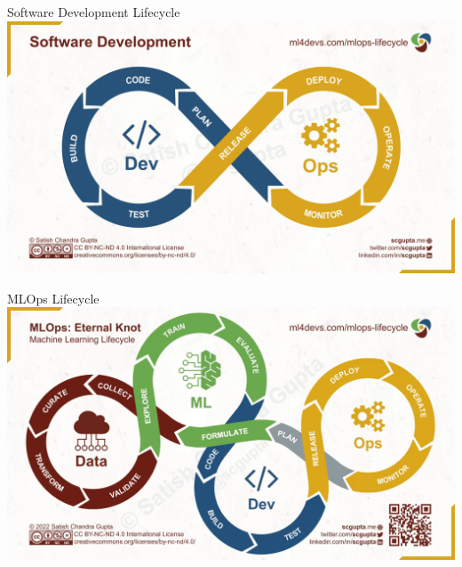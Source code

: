 \documentclass[ignorenonframetext,xcolor=x11names]{beamer}
\begin{document}
\begin{frame}{Software Development Lifecycle}
\includegraphics[width=\textwidth]{devopsmodel.jpeg}
\end{frame}


\begin{frame}{MLOps Lifecycle}
\includegraphics[width=\textwidth]{mlops2.jpeg}
\end{frame}
\end{document}
